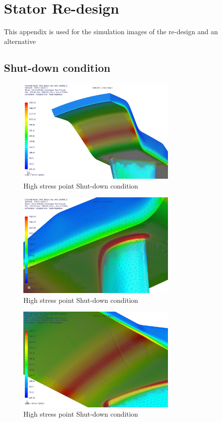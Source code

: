\section{Stator Re-design}
\label{AppendixA}
This appendix is used for the simulation images of the re-design and an alternative 
\subsection{Shut-down condition}

\begin{figure}[H]
\centering
\includegraphics[width=0.7\textwidth]{Figures/finaldesign_shutdown1.png}
\caption{High stress point Shut-down condition}
\label{fig:highstressshutdownl}
\end{figure}

\begin{figure}[H]
\centering
\includegraphics[width=0.7\textwidth]{Figures/finaldesign_shutdown2.png}
\caption{High stress point Shut-down condition }
\label{fig:highstressshutdown2}
\end{figure}

\begin{figure}[H]
\centering
\includegraphics[width=0.7\textwidth]{Figures/finaldesign_shutdown3.png}
\caption{High stress point Shut-down condition }
\label{fig:highstressshutdown3}
\end{figure}

